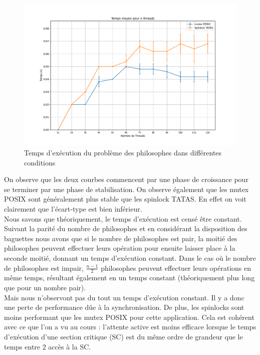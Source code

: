 \begin{figure}[h!]
    \centering
    \includegraphics[scale=0.4]{img/philosophes.pdf}
    \caption{Temps d'exécution du problème des philosophes dans différentes conditions}
    \label{pic:philo}
\end{figure}

\noindent On observe que les deux courbes commencent par une phase de croissance pour se terminer par une phase de stabilisation.
On observe également que les mutex POSIX sont généralement plus stable que les spinlock TATAS. En effet on voit clairement que l'écart-type est bien inférieur. \\

\noindent Nous savons que théoriquement, le temps d'exécution est censé être constant. Suivant la parité du nombre de philosophes et en considérant la disposition des baguettes nous avons que si le nombre de philosophes est pair, la moitié des philosophes peuvent effectuer leurs opération pour ensuite laisser place à la seconde moitié, donnant un temps d'exécution constant.
Dans le cas où le nombre de philosophes est impair, $\frac{n-1}{2}$ philosophes peuvent effectuer leurs opérations en même temps, résultant également en un temps constant (théoriquement plus long que pour un nombre pair). \\

\noindent Mais nous n'observont pas du tout un temps d'exécution constant. Il y a donc une perte de performance dûe à la synchronisation. 
De plus, les spinlocks sont moins performant que les mutex POSIX pour cette application. Cela est cohérent avec ce que l'on a vu au cours : l'attente active est moins efficace lorsque le temps d'exécution d'une section critique (SC) est du même ordre de grandeur que le temps entre 2 accès à la SC.

